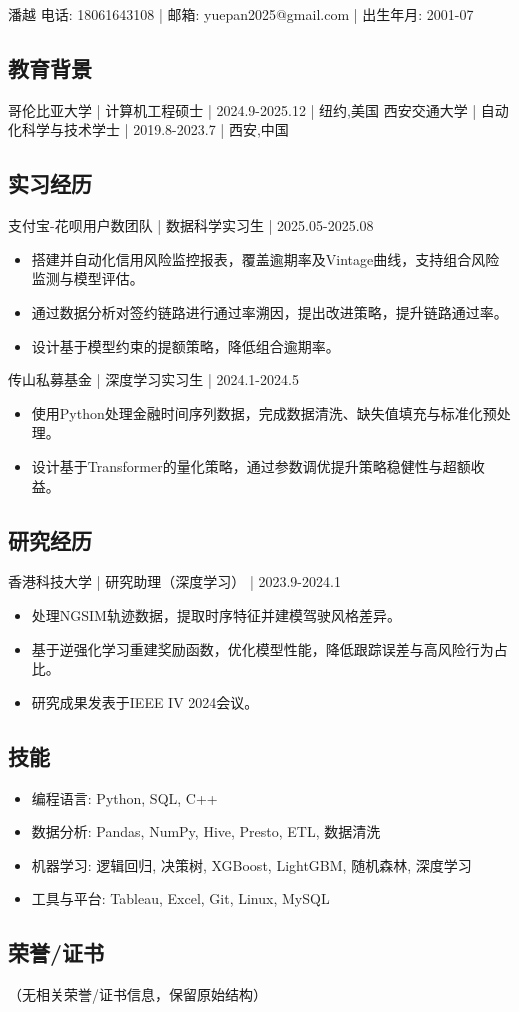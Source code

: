 \documentclass[11pt,letterpaper]{article}
\begin{document}
潘越
电话: 18061643108 | 邮箱: yuepan2025@gmail.com | 出生年月: 2001-07

\subsection{教育背景}
哥伦比亚大学 | 计算机工程硕士 | 2024.9-2025.12 | 纽约,美国  
西安交通大学 | 自动化科学与技术学士 | 2019.8-2023.7 | 西安,中国  

\subsection{实习经历}
支付宝-花呗用户数团队 | 数据科学实习生 | 2025.05-2025.08  
\begin{itemize}[leftmargin=*, topsep=0pt, itemsep=1pt]
\item 搭建并自动化信用风险监控报表，覆盖逾期率及Vintage曲线，支持组合风险监测与模型评估。  
\item 通过数据分析对签约链路进行通过率溯因，提出改进策略，提升链路通过率。  
\item 设计基于模型约束的提额策略，降低组合逾期率。  
\end{itemize}

传山私募基金 | 深度学习实习生 | 2024.1-2024.5  
\begin{itemize}[leftmargin=*, topsep=0pt, itemsep=1pt]
\item 使用Python处理金融时间序列数据，完成数据清洗、缺失值填充与标准化预处理。  
\item 设计基于Transformer的量化策略，通过参数调优提升策略稳健性与超额收益。  
\end{itemize}

\subsection{研究经历}
香港科技大学 | 研究助理（深度学习） | 2023.9-2024.1  
\begin{itemize}[leftmargin=*, topsep=0pt, itemsep=1pt]
\item 处理NGSIM轨迹数据，提取时序特征并建模驾驶风格差异。  
\item 基于逆强化学习重建奖励函数，优化模型性能，降低跟踪误差与高风险行为占比。  
\item 研究成果发表于IEEE IV 2024会议。  
\end{itemize}

\subsection{技能}
\begin{itemize}[leftmargin=*, topsep=0pt, itemsep=1pt]
\item 编程语言: Python, SQL, C++  
\item 数据分析: Pandas, NumPy, Hive, Presto, ETL, 数据清洗  
\item 机器学习: 逻辑回归, 决策树, XGBoost, LightGBM, 随机森林, 深度学习  
\item 工具与平台: Tableau, Excel, Git, Linux, MySQL  
\end{itemize}

\subsection{荣誉/证书}
（无相关荣誉/证书信息，保留原始结构）
\end{document}
